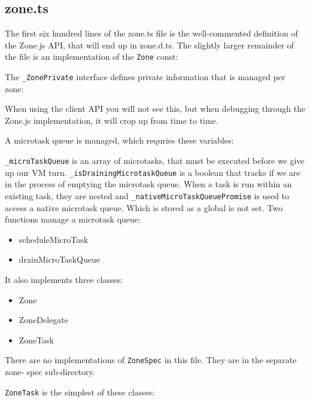\subsection{zone.ts}

The first six hundred lines of the zone.ts file is the well-commented definition of the
Zone.js API, that will end up in zone.d.ts. The slightly larger remainder of the file is an
implementation of the
\texttt{Zone}
const:



The
\texttt{\_ZonePrivate}
interface defines private information that is managed per zone:



When using the client API you will not see this, but when debugging through the
Zone.js implementation, it will crop up from time to time.

A microtask queue is managed, which requries these variables:



\texttt{\_microTaskQueue}
is an array of microtasks, that must be executed before we give up
our VM turn.
\texttt{\_isDrainingMicrotaskQueue}
is a boolean that tracks if we are in the
process of emptying the microtask queue. When a task is run within an existing task,
they are nested and
\texttt{\_nativeMicroTaskQueuePromise}
is used to access a native
microtask queue. Which is stored as a global is not set. Two functions manage a
microtask queue:

\begin{itemize}
  \item scheduleMicroTask
  \item drainMicroTaskQueue
\end{itemize}

It also implements three classes:

\begin{itemize}
  \item Zone
  \item ZoneDelegate
  \item ZoneTask
\end{itemize}

There are no implementations of
\texttt{ZoneSpec}
in this file. They are in the separate zone-
spec sub-directory.

\texttt{ZoneTask}
is the simplest of these classes:



